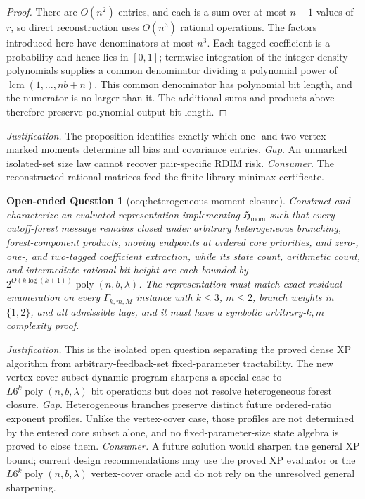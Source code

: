 \documentclass{article}
\newtheorem{openendedquestion}{Open-ended Question}
\begin{document}
\begin{proof}
There are \(O(n^2)\) entries, and each is a sum over at most \(n-1\) values of \(r\), so direct reconstruction uses \(O(n^3)\) rational operations.  The factors introduced here have denominators at most \(n^3\).  Each tagged coefficient is a probability and hence lies in \([0,1]\); termwise integration of the integer-density polynomials supplies a common denominator dividing a polynomial power of \(\operatorname{lcm}(1,\ldots,nb+n)\).  This common denominator has polynomial bit length, and the numerator is no larger than it.  The additional sums and products above therefore preserve polynomial output bit length.
\end{proof}
\par\smallskip\noindent \textit{Justification.} The proposition identifies exactly which one- and two-vertex marked moments determine all bias and covariance entries. \textit{Gap.} An unmarked isolated-set size law cannot recover pair-specific RDIM risk. \textit{Consumer.} The reconstructed rational matrices feed the finite-library minimax certificate.

\begin{openendedquestion}[oeq:heterogeneous-moment-closure]\label{oeq:heterogeneous-moment-closure}
Construct and characterize an evaluated representation implementing \(\mathfrak H_{\mathrm{mom}}\) such that every cutoff-forest message remains closed under arbitrary heterogeneous branching, forest-component products, moving endpoints at ordered core priorities, and zero-, one-, and two-tagged coefficient extraction, while its state count, arithmetic count, and intermediate rational bit height are each bounded by \(2^{O(k\log(k+1))}\operatorname{poly}(n,b,\lambda)\). The representation must match exact residual enumeration on every \(\Gamma_{k,m,M}\) instance with \(k\le3\), \(m\le2\), branch weights in \(\{1,2\}\), and all admissible tags, and it must have a symbolic arbitrary-\(k,m\) complexity proof.
\end{openendedquestion}
\par\smallskip\noindent \textit{Justification.} This is the isolated open question separating the proved dense XP algorithm from arbitrary-feedback-set fixed-parameter tractability. The new vertex-cover subset dynamic program sharpens a special case to \(L6^k\operatorname{poly}(n,b,\lambda)\) bit operations but does not resolve heterogeneous forest closure. \textit{Gap.} Heterogeneous branches preserve distinct future ordered-ratio exponent profiles. Unlike the vertex-cover case, those profiles are not determined by the entered core subset alone, and no fixed-parameter-size state algebra is proved to close them. \textit{Consumer.} A future solution would sharpen the general XP bound; current design recommendations may use the proved XP evaluator or the \(L6^k\operatorname{poly}(n,b,\lambda)\) vertex-cover oracle and do not rely on the unresolved general sharpening.
\end{document}
